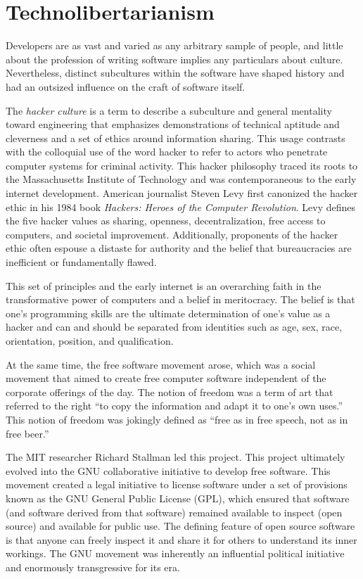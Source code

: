 \section{Technolibertarianism}

Developers are as vast and varied as any arbitrary sample of people, and little
about the profession of writing software implies any particulars about culture.
Nevertheless, distinct subcultures within the software have shaped history and
had an outsized influence on the craft of software itself.

The \textit{hacker culture} is a term to describe a subculture and general
mentality toward engineering that emphasizes demonstrations of technical
aptitude and cleverness and a set of ethics around information sharing. This
usage contrasts with the colloquial use of the word hacker to refer to actors
who penetrate computer systems for criminal activity. This hacker philosophy
traced its roots to the Massachusetts Institute of Technology and was
contemporaneous to the early internet development. American journalist Steven
Levy first canonized the hacker ethic in his 1984 book \textit{Hackers: Heroes
of the Computer Revolution}. Levy defines the five hacker values as sharing,
openness, decentralization, free access to computers, and societal improvement.
Additionally, proponents of the hacker ethic often espouse a distaste for
authority and the belief that bureaucracies are inefficient or fundamentally
flawed.

This set of principles and the early internet is an overarching faith in the
transformative power of computers and a belief in meritocracy. The belief is
that one's programming skills are the ultimate determination of one's value as a
hacker and can and should be separated from identities such as age, sex, race,
orientation, position, and qualification.

At the same time, the free software movement arose, which was a social movement
that aimed to create free computer software independent of the corporate
offerings of the day. The notion of freedom was a term of art that referred to
the right ``to copy the information and adapt it to one's own uses.'' This notion
of freedom was jokingly defined as ``free as in free speech, not as in free
beer.''

The MIT researcher Richard Stallman led this project. This project ultimately
evolved into the GNU collaborative initiative to develop free software. This
movement created a legal initiative to license software under a set of
provisions known as the GNU General Public License (GPL), which ensured that
software (and software derived from that software) remained available to inspect
(open source) and available for public use. The defining feature of open source
software is that anyone can freely inspect it and share it for others to
understand its inner workings. The GNU movement was inherently an influential
political initiative and enormously transgressive for its era.

